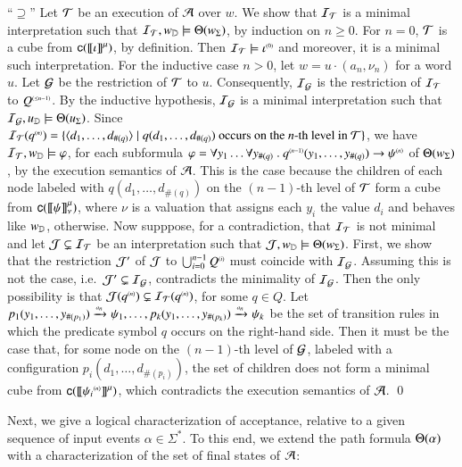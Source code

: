 \documentclass{llncs}
\begin{document}
{  ``$\supseteq$'' Let $\mathcal{T}$ be an execution of $\mathcal{A}$ over $w$. We show
  that $\mathcal{I}_{\mathcal{T}}$ is a minimal interpretation such that $\mathcal{I}_{\mathcal{T}},
  w_{\mathbb{D}} \models \Theta({w_\Sigma})$, by induction on $n \geq
  0$. For $n=0$, $\mathcal{T}$ is a cube from $\mathsf{c}({{\bf [\![} \iota {\bf ]\!]}^\mu})$, by
  definition. Then $\mathcal{I}_{\mathcal{T}} \models {\iota}^{\scriptscriptstyle{({0})}}$ and moreover, it
  is a minimal such interpretation. For the inductive case $n > 0$,
  let $w=u\cdot(a_n,\nu_n)$ for a word $u$. Let $\mathcal{G}$ be the
  restriction of $\mathcal{T}$ to $u$. Consequently, $\mathcal{I}_{\mathcal{G}}$ is the restriction
  of $\mathcal{I}_{\mathcal{T}}$ to ${Q}^{\scriptscriptstyle{({\leq n-1})}}$. By the inductive hypothesis,
  $\mathcal{I}_{\mathcal{G}}$ is a minimal interpretation such that \(\mathcal{I}_{\mathcal{G}}, u_{\mathbb{D}}
  \models \Theta({u_\Sigma})\). Since $\mathcal{I}_{\mathcal{T}}({q}^{\scriptscriptstyle{({n})}}) =
  \{ \langle d_1,\ldots,d_{\#(q)} \rangle \mid q(d_1,\ldots,d_{\#(q)})
    \text{ occurs on the $n$-th level in $\mathcal{T}$} \}$, we have $\mathcal{I}_{\mathcal{T}},
  w_{\mathbb{D}} \models \varphi$, for each subformula $\varphi = \forall y_1
  \ldots \forall y_{\#(q)} ~.~ {q}^{\scriptscriptstyle{({n-1})}}(y_1,\ldots,y_{\#(q)})
  \rightarrow {\psi}^{\scriptscriptstyle{({n})}}$ of $\Theta({w_\Sigma})$, by the
  execution semantics of $\mathcal{A}$. This is the case because the children
  of each node labeled with $q(d_1,\ldots,d_{\#(q)})$ on the
  $(n-1)$-th level of $\mathcal{T}$ form a cube from
  $\mathsf{c}({{\bf [\![} \psi {\bf ]\!]}^\mu_\nu})$, where $\nu$ is a valuation that assigns
  each $y_i$ the value $d_i$ and behaves like $w_{\mathbb{D}}$,
  otherwise. Now supppose, for a contradiction, that $\mathcal{I}_{\mathcal{T}}$ is not
  minimal and let $\mathcal{J} \subsetneq \mathcal{I}_{\mathcal{T}}$ be an interpretation such
  that $\mathcal{J},w_{\mathbb{D}} \models \Theta({w_\Sigma})$. First, we show that
  the restriction $\mathcal{J}'$ of $\mathcal{J}$ to $\bigcup_{i=0}^{n-1} {Q}^{\scriptscriptstyle{({i})}}$
  must coincide with $\mathcal{I}_{\mathcal{G}}$. Assuming this is not the case,
  i.e.\ $\mathcal{J}' \subsetneq \mathcal{I}_{\mathcal{G}}$, contradicts the minimality of
  $\mathcal{I}_{\mathcal{G}}$. Then the only possibility is that $\mathcal{J}({q}^{\scriptscriptstyle{({n})}})
  \subsetneq \mathcal{I}_{\mathcal{T}}({q}^{\scriptscriptstyle{({n})}})$, for some $q \in Q$. Let
  $p_1(y_1,\ldots,y_{\#(p_1)}) \xrightarrow{{\scriptscriptstyle a_n}}_{{\scriptstyle }} \psi_1, \ldots,
  p_k(y_1,\ldots,y_{\#(p_k)}) \xrightarrow{{\scriptscriptstyle a_n}}_{{\scriptstyle }} \psi_k$ be the set of
  transition rules in which the predicate symbol $q$ occurs on the
  right-hand side. Then it must be the case that, for some node on the
  $(n-1)$-th level of $\mathcal{G}$, labeled with a configuration
  $p_i(d_1,\ldots,d_{\#(p_i)})$, the set of children does not form a
  minimal cube from $\mathsf{c}({{\bf [\![} {\psi_i}^{\scriptscriptstyle{({n})}} {\bf ]\!]}^\mu})$, which
  contradicts the execution semantics of $\mathcal{A}$. \qed}

Next, we give a logical characterization of acceptance, relative to a
given sequence of input events $\alpha \in \Sigma^*$. To this end, we
extend the path formula $\Theta({\alpha})$ with a characterization of
the set of final states of $\mathcal{A}$: 
\end{document}
